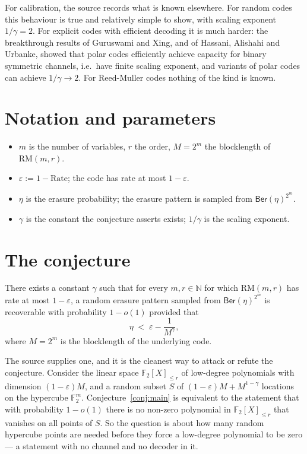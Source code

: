 \documentclass{aicr-conjecture}
\newcommand{\eps}{\varepsilon}
\newcommand{\F}{\mathbb{F}}
\newcommand{\RM}{\mathrm{RM}}
\newcommand{\Ber}{\mathsf{Ber}}
\begin{document}
For calibration, the source records what is known elsewhere. For random
codes this behaviour is true and relatively simple to show, with scaling
exponent $1/\gamma = 2$. For explicit codes with efficient decoding it is
much harder: the breakthrough results of Guruswami and Xing, and of
Hassani, Alishahi and Urbanke, showed that polar codes efficiently achieve
capacity for binary symmetric channels, i.e.\ have finite scaling
exponent, and variants of polar codes can achieve $1/\gamma \to 2$. For
Reed-Muller codes nothing of the kind is known.

\section{Notation and parameters}\label{sec:notation}

\begin{itemize}[nosep]
  \item $m$ is the number of variables, $r$ the order, $M = 2^{m}$ the
    blocklength of $\RM(m,r)$.
  \item $\eps := 1 - \mathrm{Rate}$; the code has rate at most
    $1 - \eps$.
  \item $\eta$ is the erasure probability; the erasure pattern is
    sampled from $\Ber(\eta)^{2^{m}}$.
  \item $\gamma$ is the constant the conjecture asserts exists;
    $1/\gamma$ is the scaling exponent.
\end{itemize}

\section{The conjecture}\label{sec:conjectures}

\begin{conjecture}\label{conj:main}
There exists a constant $\gamma$ such that for every $m, r \in
\mathbb{N}$ for which $\RM(m,r)$ has rate at most $1 - \eps$, a random
erasure pattern sampled from $\Ber(\eta)^{2^{m}}$ is recoverable with
probability $1 - o(1)$ provided that
\[
  \eta \;<\; \eps - \frac{1}{M^{\gamma}},
\]
where $M = 2^{m}$ is the blocklength of the underlying code.
\end{conjecture}

\begin{remark}\label{rem:algebraic}
The source supplies one, and it is the cleanest way to attack or refute
the conjecture. Consider the linear space $\F_{2}[X]_{\le r}$ of
low-degree polynomials with dimension $(1-\eps)M$, and a random subset
$S$ of $(1-\eps)M + M^{1-\gamma}$ locations on the hypercube
$\F_{2}^{m}$. Conjecture~\ref{conj:main} is equivalent to the statement
that with probability $1 - o(1)$ there is no non-zero polynomial in
$\F_{2}[X]_{\le r}$ that vanishes on all points of $S$. So the question
is about how many random hypercube points are needed before they force a
low-degree polynomial to be zero --- a statement with no channel and no
decoder in it.
\end{remark}
\end{document}
